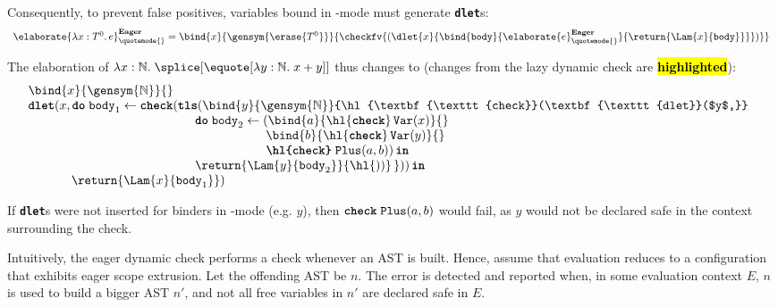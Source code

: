 Consequently, to prevent false positives, variables bound in \quotemode{}-mode must generate \textbf{\texttt{dlet}}s:
{
  \footnotesize
\[
\begin{array}{rcl}
\elaborate{\lambda x: T^0. \, e}_{\quotemode{}}^{\textbf{Eager}} = \bind{x}{\gensym{\erase{T^0}}}{\checkfv{(\dlet{x}{\bind{\texttt{body}}{\elaborate{e}_{\quotemode{}}^\textbf{Eager}}{\return{\Lam{x}{\texttt{body}}}}})}}
\end{array}\]
}

The elaboration of $\lambda x:\mathbb{N}. \; \splice[{\equote[\lambda{y}: \mathbb{N}. \; x+y]}]$ thus changes to (changes from the lazy dynamic check are \textbf{\hl{highlighted}}):
{
  \renewcommand{\varToAST}[1]{\hl{\textbf{\texttt{check}}}\, \texttt{Var}(#1)}
\[\begin{array}{@{}l}
  \bind{x}{\gensym{\mathbb{N}}}{} \\
  {\textbf{\texttt{dlet}}(}{x}, \textbf{\texttt{do}} \; {\texttt{body}_1} \leftarrow {\textbf{\texttt{check}}(}\textbf{\texttt{tls}}({\bind{y}{\gensym{\mathbb{N}}}{\hl{\textbf{\texttt{check}}(\textbf{\texttt{dlet}}($y$,}}} \\
    \quad\quad\quad\quad\quad\quad\quad
    \quad\quad\quad\quad\quad\quad\,\,
    \textbf{\texttt{do}}\;{\texttt{body}_2} \leftarrow {(\bind{a}{{\varToAST{x}}}{}}\\
    \quad\quad\quad\quad\quad\quad\quad\quad
    \quad\quad\quad\quad\quad\quad\quad\quad
    \quad\quad\quad
    \bind{b}{{\varToAST{y}}}{}\\
    \quad\quad\quad\quad\quad\quad\quad\quad
    \quad\quad\quad\quad\quad\quad\quad\quad
    \quad\quad\quad
    \textbf{\texttt{\hl{check}}}\;{\texttt{Plus}(a, b)}) \, \textbf{\texttt{in}}\\
    \quad\quad\quad\quad\quad\quad\quad
    \quad\quad\quad\quad\quad\quad\,\,
    \return{\Lam{y}{\texttt{body}_2}}{\hl{))}\,})) \, \textbf{\texttt{in}}\\
  \quad\quad\quad\;\, {\return{\Lam{x}{\texttt{body}_1}}})
\end{array}\]
}

If \textbf{\texttt{dlet}}s were not inserted for binders in \quotemode{}-mode (e.g. $y$), then $\textbf{\texttt{check}}\; \texttt{Plus}(a, b)$ would fail, as $y$ would not be declared safe in the context surrounding the check. 

Intuitively, the eager dynamic check performs a check whenever an AST is built. Hence, assume that evaluation reduces to a configuration that exhibits eager scope extrusion. Let the offending AST be $n$. The error is detected and reported when, in some evaluation context $E$, $n$ is used to build a bigger AST $n'$, and not all free variables in $n'$ are declared safe in $E$. 

